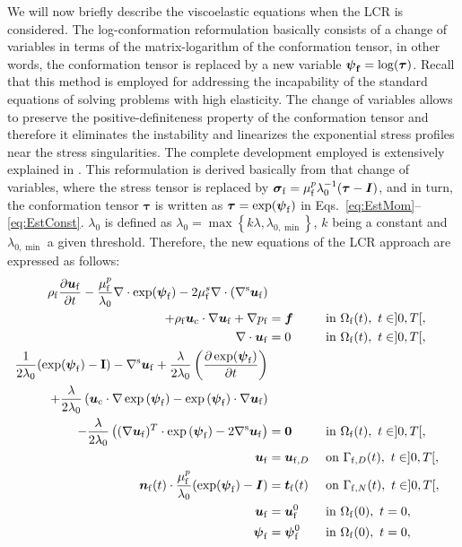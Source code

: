 \documentclass[11pt,english]{article}
\def\ufluid{\boldsymbol{u}_{\rm{f}}}
\def\ufluidD{\boldsymbol{u}_{{\rm{f}},D}}
\def\sigmafluid{\boldsymbol{\sigma}_{\rm{f}}}
\def\pfluid{p_{\rm{f}}}
\def\psifluid{\boldsymbol{\psi}_{\rm{f}}}
\def\viscs{\mu^{s}_{\rm{f}}}
\def\viscp{\mu^{p}_{\rm{f}}}
\def\alevelocity{\boldsymbol{u}_{\mathrm{c}}}
\begin{document}
We will now briefly describe the viscoelastic equations when the LCR is considered. 
{The log-conformation reformulation basically consists of a change of variables in terms of the matrix-logarithm of the conformation tensor, in other words, the conformation tensor is replaced by a new variable $\boldsymbol{\psifluid}=\log(\boldsymbol{\tau})$. Recall that this method is employed for addressing the incapability of the standard equations of solving problems with high elasticity. The change of variables allows to preserve the positive-definiteness property of the conformation tensor and therefore it eliminates the instability and linearizes the exponential stress profiles near the stress singularities.} The complete development employed is extensively explained in \cite{moreno2019logarithmic}. 
This reformulation is derived basically from that change of variables, where the stress tensor is replaced by $\sigmafluid={\viscp}{\lambda^{-1}_{0}}(\boldsymbol{\tau}-\boldsymbol{I})$,
and in turn, the conformation tensor $\boldsymbol{\tau}$ is written
as $\boldsymbol{\tau}=\exp(\psifluid)$ in Eqs.~\eqref{eq:EstMom}--\eqref{eq:EstConst}. $\lambda_{0}$ is defined as $\lambda_{0}=\max\left\{ k\lambda,\lambda_{0,\min}\right\} $, $k$ being a constant and $\lambda_{0,\min}$ a given threshold. Therefore, the new equations of the LCR approach are expressed as follows: 
\begin{align}
    \rho_{\rm{f}}\dfrac{\partial\ufluid}{\partial t}-\dfrac{\viscp}{\lambda_{0}}\nabla\cdot\exp(\psifluid)-2\viscs\nabla\cdot(\nabla^{\rm s}\ufluid)& \nonumber \\
    +\rho_{\rm{f}}\alevelocity\cdot\nabla\ufluid+\nabla \pfluid & =\boldsymbol{f}  &&\text{ in } \ensuremath{\Omega}_{\rm{f}}(t), ~t\in]0,T[, \label{eq:LogMom}\\
    \nabla\cdot\ufluid & =0  &&\text{ in } \ensuremath{\Omega}_{\rm{f}}(t), ~t\in]0,T[,\label{eq:LogCont}\\
    \dfrac{1}{2\lambda_{0}}(\exp(\psifluid)-\textbf{\text{I}})-\nabla^{\rm s}\ufluid\nonumber
    +\dfrac{\lambda}{2\lambda_{0}}\left(\frac{\partial\exp(\psifluid)}{\partial t}\right)\nonumber &\\
    +\dfrac{\lambda}{2\lambda_{0}}\left(\alevelocity\cdot\nabla\exp{(\psifluid)}-\exp{(\psifluid)}\cdot\nabla\ufluid\right) & \nonumber \\
    -\dfrac{\lambda}{2\lambda_{0}}\left((\nabla\ufluid)^{T}\cdot\exp{(\psifluid)}-2\nabla^{\rm s}\ufluid\right)&=\boldsymbol{0}  &&\text{ in } \ensuremath{\Omega}_{\rm{f}}(t), ~t\in]0,T[,\label{eq:LogConst}\\
    \ufluid&=\ufluidD &&\text{ on }  \Gamma_{{\rm{f}},D}(t), ~t \in]0,T[,  \\
    \boldsymbol{n}_{\rm{f}}(t)\cdot \dfrac{\viscp}{\lambda_0}(\exp(\psifluid)-\boldsymbol{I})&=\boldsymbol{t}_{\rm{f}}(t) &&\text{ on }  \Gamma_{{\rm{f}},N}(t),  ~t \in]0,T[,  \\
    \ufluid&=\ufluid^0 &&\text{ in }  \Omega_{\rm{f}}(0), ~t=0, \\
    \psifluid&=\psifluid^0 &&\text{ in }  \Omega_{\rm{f}}(0), ~t=0,
\end{align}
\end{document}
